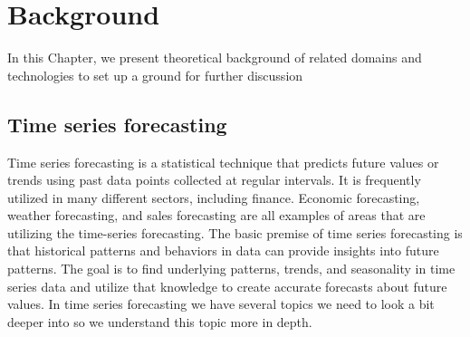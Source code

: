 \documentclass{imc-inf}
\begin{document}
	
	
	
	\chapter{Background}\label{chap:background}
	
	In this Chapter, we present theoretical background of related domains and technologies to set up a ground for further discussion
	
	
	\section{Time series forecasting}
	Time series forecasting \cite{time_ser} is a statistical technique that predicts future values or trends using past data points collected at regular intervals. It is frequently utilized in many different sectors, including finance.
	Economic forecasting, weather forecasting, and sales forecasting are all examples of areas that are utilizing the time-series forecasting.
	The basic premise of time series forecasting is that historical patterns and behaviors in data can provide insights into future patterns. The goal is to find underlying patterns, trends, and seasonality in time series data and utilize that knowledge to create accurate forecasts about future values.
	In time series forecasting we have several topics we need to look a bit deeper into so we understand this topic more in depth.
	
	
	
\end{document}
